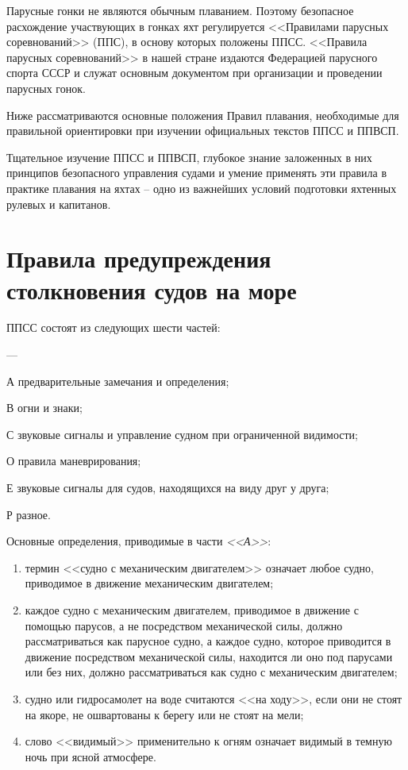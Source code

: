 \documentclass[a4paper, 12pt, twoside, final]{scrbook}
\begin{document}
Парусные гонки не являются обычным плаванием. Поэтому безопасное расхождение участвующих в гонках яхт регулируется <<Правилами парусных соревнований>> (ППС), в основу которых положены ППСС. <<Правила парусных соревнований>> в нашей стране издаются Федерацией парусного спорта СССР и служат основным документом при организации и проведении парусных гонок.

Ниже рассматриваются основные положения Правил плавания, необходимые для правильной ориентировки при изучении официальных текстов ППСС и ППВСП.

Тщательное изучение ППСС и ППВСП, глубокое знание заложенных в них принципов безопасного управления судами и умение применять эти правила в практике плавания на яхтах \--- одно из важнейших условий подготовки яхтенных рулевых и капитанов.

\section{Правила предупреждения столкновения судов на море}

ППСС состоят из следующих шести частей:

\begin{desclist}{\bfseries}{ \hfill---}
\item[А] предварительные замечания и определения;
\item[В] огни и знаки;
\item[С] звуковые сигналы и управление судном при ограниченной видимости;
\item[О] правила маневрирования;
\item[Е] звуковые сигналы для судов, находящихся на виду друг у друга;
\item[Р] разное.
\end{desclist}

Основные определения, приводимые в части \textit{<<А>>}:

\begin{enumerate}
\item термин <<судно с механическим двигателем>> означает любое судно, приводимое в движение механическим двигателем;
\item каждое судно с механическим двигателем, приводимое в движение с помощью парусов, а не посредством механической силы, должно рассматриваться как парусное судно, а каждое судно, которое приводится в движение посредством механической силы, находится ли оно под парусами или без них, должно рассматриваться как судно с механическим двигателем;
\item судно или гидросамолет на воде считаются <<на ходу>>, если они не стоят на якоре, не ошвартованы к берегу или не стоят на мели;
\item слово <<видимый>>    применительно к огням означает    видимый    в темную ночь при ясной атмосфере.
\end{enumerate}
\end{document}

